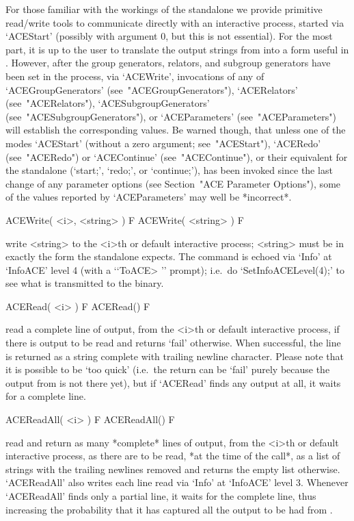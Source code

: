 For those familiar with the  workings  of  the  {\ACE}  standalone  we
provide primitive read/write tools to  communicate  directly  with  an
interactive {\ACE} process,  started  via  `ACEStart'  (possibly  with
argument 0, but this is not essential). For the most part, it is up to
the user to translate the output  strings  from  {\ACE}  into  a  form
useful in {\GAP}. However, after the group generators,  relators,  and
subgroup  generators  have  been  set  in  the  {\ACE}  process,   via
`ACEWrite',    invocations    of    any    of     `ACEGroupGenerators'
(see~"ACEGroupGenerators"),     `ACERelators'     (see~"ACERelators"),
`ACESubgroupGenerators'       (see~"ACESubgroupGenerators"),        or
`ACEParameters' (see~"ACEParameters") will establish the corresponding
{\GAP} values.  Be  warned  though,  that  unless  one  of  the  modes
`ACEStart'  (without  a  zero  argument;  see~"ACEStart"),   `ACERedo'
(see~"ACERedo")  or  `ACEContinue'   (see~"ACEContinue"),   or   their
equivalent  for  the  standalone   {\ACE}   (`start;',   `redo;',   or
`continue;'), has been invoked since the last change of any  parameter
options (see Section~"ACE Parameter  Options"),  some  of  the  values
reported by `ACEParameters' may well be *incorrect*.

\beginitems

\>ACEWrite( <i>, <string> ) F
\>ACEWrite( <string> ) F

write <string> to the <i>th or  default  interactive  {\ACE}  process;
<string> must be in exactly the form the  {\ACE}  standalone  expects.
The command is  echoed  via  `Info'  at  `InfoACE'  level  4  (with  a
\lq{}`ToACE> '' prompt); i.e.~do `SetInfoACELevel(4);' to see what  is
transmitted to the {\ACE} binary.

\>ACERead( <i> ) F
\>ACERead() F

read a complete line of {\ACE}  output,  from  the  <i>th  or  default
interactive {\ACE} process, if there is output to be read and  returns
`fail' otherwise. When successful, the line is returned  as  a  string
complete with trailing newline  character.  Please  note  that  it  is
possible to be \lq{}too quick' (i.e.~the return can be  `fail'  purely
because the output from {\ACE} is not there  yet),  but  if  `ACERead'
finds any output at all, it waits for a complete line.

\>ACEReadAll( <i> ) F
\>ACEReadAll() F

read and return as many *complete* lines of {\ACE}  output,  from  the
<i>th or default interactive {\ACE} process, as there are to be  read,
*at the time of the call*, as a list  of  strings  with  the  trailing
newlines removed and returns the empty  list  otherwise.  `ACEReadAll'
also writes each line read via `Info' at `InfoACE' level  3.  Whenever
`ACEReadAll' finds only a partial line,  it  waits  for  the  complete
line, thus increasing the probability that it  has  captured  all  the
output to be had from {\ACE}.


